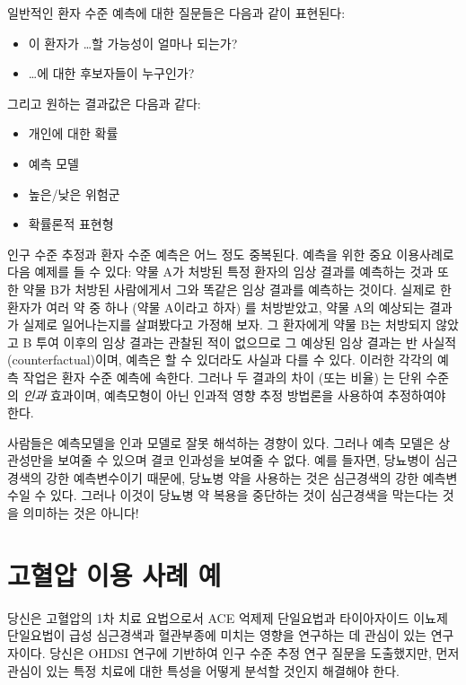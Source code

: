 \documentclass[11pt]{book}
\providecommand{\tightlist}{%
  \setlength{\itemsep}{0pt}\setlength{\parskip}{0pt}}
\theoremstyle{definition}
\theoremstyle{definition}
\theoremstyle{definition}
\theoremstyle{remark}
\let\BeginKnitrBlock\begin \let\EndKnitrBlock\end
\begin{document}
일반적인 환자 수준 예측에 대한 질문들은 다음과 같이 표현된다:

\begin{itemize}
\tightlist
\item
  이 환자가 \ldots{}할 가능성이 얼마나 되는가?
\item
  \ldots{}에 대한 후보자들이 누구인가?
\end{itemize}

그리고 원하는 결과값은 다음과 같다:

\begin{itemize}
\tightlist
\item
  개인에 대한 확률
\item
  예측 모델
\item
  높은/낮은 위험군
\item
  확률론적 표현형
\end{itemize}

인구 수준 추정과 환자 수준 예측은 어느 정도 중복된다. 예측을 위한 중요
이용사례로 다음 예제를 들 수 있다: 약물 A가 처방된 특정 환자의 임상
결과를 예측하는 것과 또한 약물 B가 처방된 사람에게서 그와 똑같은 임상
결과를 예측하는 것이다. 실제로 한 환자가 여러 약 중 하나 (약물 A이라고
하자) 를 처방받았고, 약물 A의 예상되는 결과가 실제로 일어나는지를
살펴봤다고 가정해 보자. 그 환자에게 약물 B는 처방되지 않았고 B 투여
이후의 임상 결과는 관찰된 적이 없으므로 그 예상된 임상 결과는 반 사실적
(counterfactual)이며, 예측은 할 수 있더라도 사실과 다를 수 있다. 이러한
각각의 예측 작업은 환자 수준 예측에 속한다. 그러나 두 결과의 차이 (또는
비율) 는 단위 수준의 \emph{인과} 효과이며, 예측모형이 아닌 인과적 영향
추정 방법론을 사용하여 추정하여야 한다.

\BeginKnitrBlock{rmdimportant}
사람들은 예측모델을 인과 모델로 잘못 해석하는 경향이 있다. 그러나 예측
모델은 상관성만을 보여줄 수 있으며 결코 인과성을 보여줄 수 없다. 예를
들자면, 당뇨병이 심근경색의 강한 예측변수이기 때문에, 당뇨병 약을
사용하는 것은 심근경색의 강한 예측변수일 수 있다. 그러나 이것이 당뇨병
약 복용을 중단하는 것이 심근경색을 막는다는 것을 의미하는 것은 아니다!
\EndKnitrBlock{rmdimportant}

\section{고혈압 이용 사례 예}\label{---}

당신은 고혈압의 1차 치료 요법으로서 ACE 억제제 단일요법과 타이아자이드
이뇨제 단일요법이 급성 심근경색과 혈관부종에 미치는 영향을 연구하는 데
관심이 있는 연구자이다. 당신은 OHDSI 연구에 기반하여 인구 수준 추정 연구
질문을 도출했지만, 먼저 관심이 있는 특정 치료에 대한 특성을 어떻게
분석할 것인지 해결해야 한다.
\end{document}
